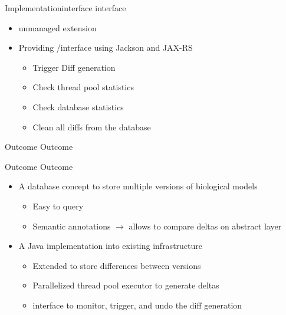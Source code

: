 \begin{frame}{Implementation}{\rest interface}
	{\Large \rest interface}
	\\[2.5em]
	\begin{itemize}
		\item \neoj unmanaged extension
		\item Providing \json/\rest interface using Jackson and JAX-RS
		\begin{itemize}
			\item Trigger Diff generation
			\item Check thread pool statistics
			\item Check database statistics
			\item Clean all diffs from the database
		\end{itemize}
	\end{itemize}
\end{frame}

\begin{frame}{Outcome}{}
	\centering
	\LARGE Outcome
\end{frame}

\begin{frame}{Outcome}{}
	{\Large Outcome}
	\\[2.5em]
	\begin{itemize}
		\item A database concept to store multiple versions of biological models
		\begin{itemize}
			\item Easy to query
			\item Semantic annotations $\rightarrow$ allows to compare deltas on abstract layer
		\end{itemize}
		\item A Java implementation into existing infrastructure
		\begin{itemize}
			\item Extended \masymos to store differences between versions
			\item Parallelized thread pool executor to generate deltas
			\item \rest interface to monitor, trigger, and undo the diff generation
		\end{itemize}
	\end{itemize}
	
\end{frame}

